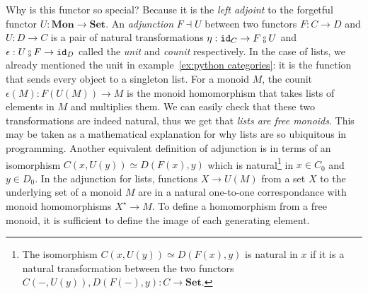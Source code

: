 Why is this functor so special? Because it is the \emph{left adjoint} to the forgetful functor $U : \mathbf{Mon} \to \mathbf{Set}$.
An \emph{adjunction} $F \dashv U$ between two functors $F : C \to D$ and $U : D \to C$ is a pair of natural transformations $\eta : \id_C \to F \fcmp U$ and $\epsilon : U \fcmp F \to \id_D$ called the \emph{unit} and \emph{counit} respectively.
In the case of lists, we already mentioned the unit in example~\ref{ex:python categories}: it is the function that sends every object to a singleton list.
For a monoid $M$, the counit $\epsilon(M) : F(U(M)) \to M$ is the monoid homomorphism that takes lists of elements in $M$ and multiplies them.
We can easily check that these two transformations are indeed natural, thus we get that \emph{lists are free monoids}.
This may be taken as a mathematical explanation for why lists are so ubiquitous in programming.
Another equivalent definition of adjunction is in terms of an isomorphism $C(x, U(y)) \simeq D(F(x), y)$ which is natural\footnote
{The isomorphism $C(x, U(y)) \simeq D(F(x), y)$ is natural in $x$ if it is a natural transformation between the two functors $C(-, U(y)), D(F(-), y) : C \to \mathbf{Set}$.}
in $x \in C_0$ and $y \in D_0$.
In the adjunction for lists, functions $X \to U(M)$ from a set $X$ to the underlying set of a monoid $M$ are in a natural one-to-one correspondance with monoid homomorphisms $X^\star \to M$.
To define a homomorphism from a free monoid, it is sufficient to define the image of each generating element.

